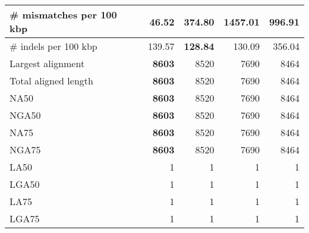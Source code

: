 \documentclass[12pt,a4paper]{article}
\begin{document}
\begin{table}[ht]
\begin{center}
\begin{tabular}{|l*{4}{|r}|}
\# mismatches per 100 kbp & {\bf 46.52} & 374.80 & 1457.01 & 996.91 \\ \hline
\# indels per 100 kbp & 139.57 & {\bf 128.84} & 130.09 & 356.04 \\ \hline
Largest alignment & {\bf 8603} & 8520 & 7690 & 8464 \\ \hline
Total aligned length & {\bf 8603} & 8520 & 7690 & 8464 \\ \hline
NA50 & {\bf 8603} & 8520 & 7690 & 8464 \\ \hline
NGA50 & {\bf 8603} & 8520 & 7690 & 8464 \\ \hline
NA75 & {\bf 8603} & 8520 & 7690 & 8464 \\ \hline
NGA75 & {\bf 8603} & 8520 & 7690 & 8464 \\ \hline
LA50 & 1 & 1 & 1 & 1 \\ \hline
LGA50 & 1 & 1 & 1 & 1 \\ \hline
LA75 & 1 & 1 & 1 & 1 \\ \hline
LGA75 & 1 & 1 & 1 & 1 \\ \hline
\end{tabular}
\end{center}
\end{table}
\end{document}
